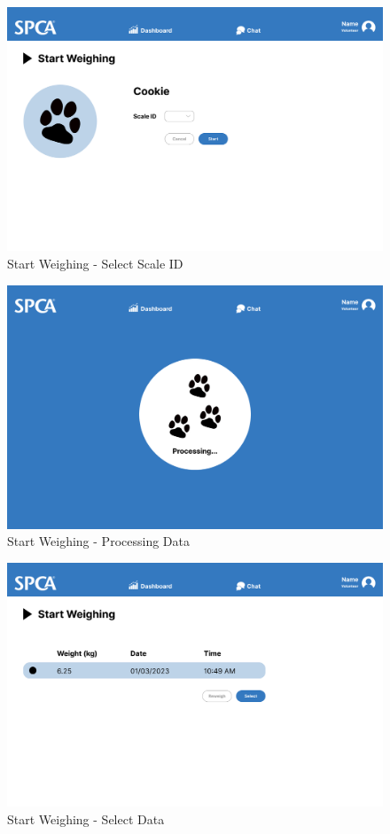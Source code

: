 \begin{figure}[h]
\centering
\includegraphics[width=\textwidth]{proposal/parts/add-data-1.png}
\caption{Start Weighing - Select Scale ID}
\end{figure}

\begin{figure}[h]
\centering
\includegraphics[width=\textwidth]{proposal/parts/add-data-2.png}
\caption{Start Weighing - Processing Data}
\end{figure}

\begin{figure}[h]
\centering
\includegraphics[width=\textwidth]{proposal/parts/add-data-3.png}
\caption{Start Weighing - Select Data}
\end{figure}

